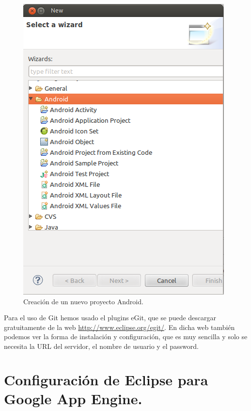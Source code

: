 \begin{figure}
  \centering
    \includegraphics[scale=0.6]{./ConfiguracionEclipse/imagenes/nuevoProyectoAndroid.png}
  \caption{Creación de un nuevo proyecto Android.}
  \label{fig:nuevoProyectoAndroid}
\end{figure}

Para el uso de Git hemos usado el plugins eGit, que se puede descargar gratuitamente de la web \url{http://www.eclipse.org/egit/}. En dicha web también podemos ver la forma de instalación y configuración, que es muy sencilla y solo se necesita la URL del servidor, el nombre de usuario y el password.

\section{Configuración de Eclipse para Google App Engine.}\label{cap:configuracionGAEEclipse}

